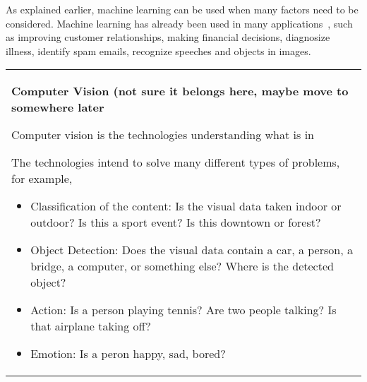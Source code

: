 As explained earlier, machine learning can be used when many factors
need to be considered.  Machine learning has already been used in many
applications~\cite{Alpaydin2010IntroductiontoMachine}, such as
improving customer relationships, making financial decisions,
diagnosize illness, identify spam emails, recognize speeches and
objects in images.

\vspace{0.1in}
  \begin{tabular}{p{5in}}
\index{computer vision}
  \begin{center}
    {\bf Computer Vision (not sure it belongs here, maybe move to
    somewhere later}
  \end{center}

  Computer vision is the technologies understanding what is in

 The
technologies intend to solve many different types of problems, for
example,

\begin{itemize}
\item Classification of the content: Is the visual data taken indoor
  or outdoor?  Is this a sport event?  Is this downtown or forest?

\item Object Detection: Does the visual data contain a car, a person,
  a bridge, a computer, or something else?  Where is the detected
  object?

\item Action: Is a person playing tennis? Are two people talking?
  Is that airplane taking off?

\item Emotion: Is a peron happy, sad, bored?

\end{itemize}

  \end{tabular}
\vspace{0.1in}



